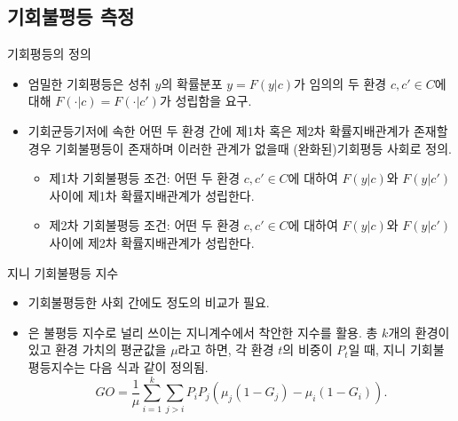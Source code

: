 \documentclass[aspectratio=169,xcolor=dvipsnames,handout]{beamer}
\begin{document}
\subsection{기회불평등 측정}
\begin{frame}{기회평등의 정의}
  \begin{itemize}
    \item 엄밀한 기회평등은 성취 $y$의 확률분포 $y=F(y|c)$가 임의의 두 환경 $c,c' \in C$에 대해 $F(\cdot | c) = F(\cdot | c')$가 성립함을 요구.
    \item 기회균등기저에 속한 어떤 두 환경 간에 제1차 혹은 제2차 확률지배관계가 존재할 경우 기회불평등이 존재하며 이러한 관계가 없을때 (완화된)기회평등 사회로 정의.
    \begin{itemize}
        \item 제1차 기회불평등 조건: 어떤 두 환경 $c,c' \in C$에 대하여 $F(y | c)$와 $F(y | c')$사이에 제1차 확률지배관계가 성립한다.
        \item 제2차 기회불평등 조건: 어떤 두 환경 $c,c' \in C$에 대하여 $F(y | c)$와 $F(y | c')$사이에 제2차 확률지배관계가 성립한다.
    \end{itemize}
  \end{itemize}
\end{frame}

\begin{frame}{지니 기회불평등 지수}
  \begin{itemize}
    \item 기회불평등한 사회 간에도 정도의 비교가 필요.
    \item \citet{letl08}은 불평등 지수로 널리 쓰이는 지니계수에서 착안한 지수를 활용. 총 $k$개의 환경이 있고 환경 가치의 평균값을 $\mu$라고 하면, 각 환경 $t$의 비중이 $P_t$일 때, 지니 기회불평등지수는 다음 식과 같이 정의됨.
    \begin{equation}
        G O=\frac{1}{\mu} \sum_{i=1}^{k} \sum_{j>i} P_{i} P_{j}\left(\mu_{j}\left(1-G_{j}\right)-\mu_{i}\left(1-G_{i}\right)\right).
        \label{eq:goms_GOI}
    \end{equation}
  \end{itemize}
\end{frame}
\end{document}
